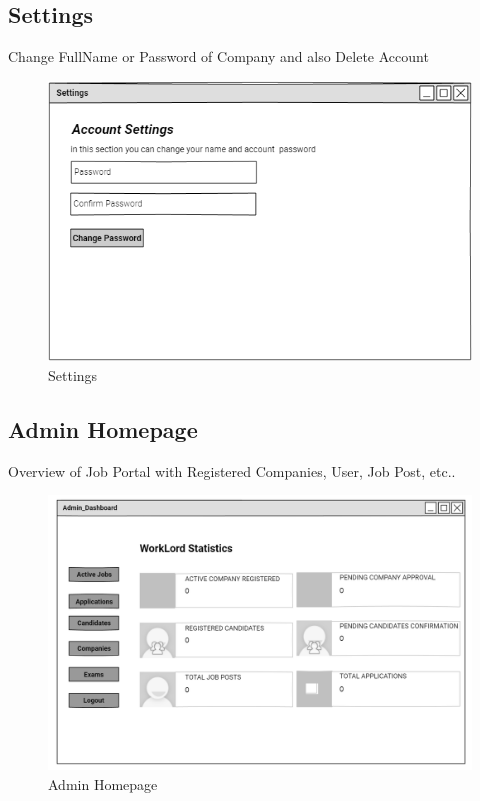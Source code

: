 \documentclass[a4paper,12pt]{report}
\begin{document}
\subsection {Settings}
Change FullName or Password of Company and also Delete Account
\begin{figure}[bph]
	\centering
	\includegraphics[width=.6\linewidth]{img/company/cmpnystngs}
	\caption{Settings}
\end{figure}
\pagebreak
{}
\subsection {Admin Homepage}
Overview of Job Portal with Registered Companies, User, Job Post, etc.. 
\begin{figure}[bph]
	\centering
	\includegraphics[width=1\linewidth]{img/admin/admindash}
	\caption{Admin Homepage}
\end{figure}


\pagebreak
\end{document}

